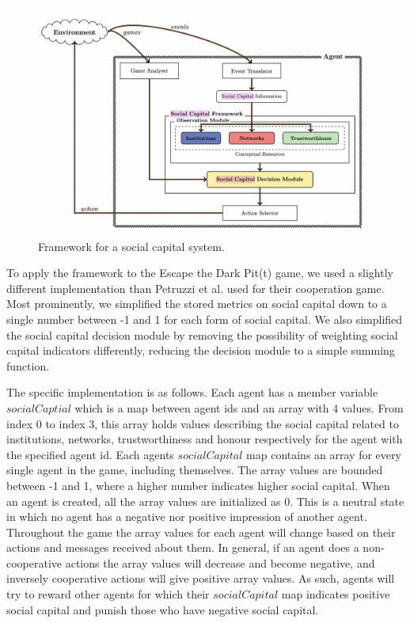 \begin{figure}[!h]
    \centering
    \includegraphics[width=0.75\linewidth]{004_team_1_agent_design/images/socialcapitalframework.png}
    \caption{Framework for a social capital system.\cite{pitt}}
    \label{fig:social_capital_framework}
\end{figure}

To apply the framework to the Escape the Dark Pit(t) game, we used a slightly different implementation than Petruzzi et al. used for their cooperation game. Most prominently, we simplified the stored metrics on social capital down to a single number between -1 and 1 for each form of social capital. We also simplified the social capital decision module by removing the possibility of weighting social capital indicators differently, reducing the decision module to a simple summing function. 

The specific implementation is as follows. Each agent has a member variable $socialCaptial$ which is a map between agent ids and an array with 4 values. From index 0 to index 3, this array holds values describing the social capital related to institutions, networks, trustworthiness and honour respectively for the agent with the specified agent id. Each agents $socialCapital$ map contains an array for every single agent in the game, including themselves. The array values are bounded between -1 and 1, where a higher number indicates higher social capital. When an agent is created, all the array values are initialized as 0. This is a neutral state in which no agent has a negative nor positive impression of another agent. Throughout the game the array values for each agent will change based on their actions and messages received about them. In general, if an agent does a non-cooperative actions the array values will decrease and become negative, and inversely cooperative actions will give positive array values. As such, agents will try to reward other agents for which their $socialCapital$ map indicates positive social capital and punish those who have negative social capital.


